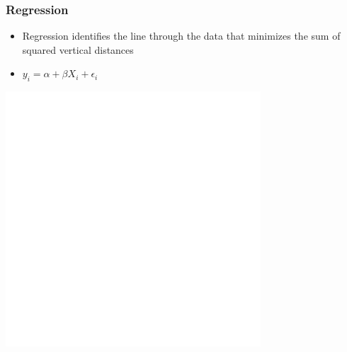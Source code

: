 \documentclass[xcolor=x11names,compress]{beamer}\usepackage[]{graphicx}\usepackage[]{color}
\makeatletter
\def\maxwidth{ %
  \ifdim\Gin@nat@width>\linewidth
    \linewidth
  \else
    \Gin@nat@width
  \fi
}
\newenvironment{knitrout}{}{} %
\renewcommand{\(}{\begin{columns}}
\renewcommand{\)}{\end{columns}}
\newcommand{\<}[1]{\begin{column}{#1}}
\renewcommand{\>}{\end{column}}
\makeatother
\begin{document}
\begin{frame}
\frametitle{Regression}
\begin{itemize}
\item Regression identifies the line through the data that minimizes the sum of squared vertical distances 
\item $y_i = \alpha + \beta X_i + \epsilon_i$
\end{itemize}
\begin{multicols}{2}
\begin{knitrout}
\color{fgcolor}
\includegraphics[width=\maxwidth]{figure/graph_reg4-1} 

\end{knitrout}
\columnbreak
\end{multicols}
\end{frame}
\end{document}
